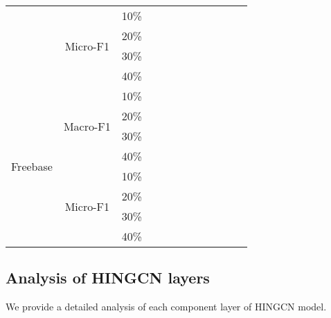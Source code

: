 \begin{table*}[!htbp]
\begin{tabular}{|c|c|c||c|c|c|c|c||c|c|c|c|}
                          & \multirow{4}{*}{Micro-F1} & 10\%     &          &              &     &     &     &        &        &        &        \\
                          &                           & 20\%     &          &              &     &     &     &        &        &        &        \\
                          &                           & 30\%     &          &              &     &     &     &        &        &        &        \\
                          &                           & 40\%     &          &              &     &     &     &        &        &        &        \\ \hline
\multirow{8}{*}{Freebase} & \multirow{4}{*}{Macro-F1} & 10\%     &          &              &     &     &     &        &        &        &        \\
                          &                           & 20\%     &          &              &     &     &     &        &        &        &        \\
                          &                           & 30\%     &          &              &     &     &     &        &        &        &        \\
                          &                           & 40\%     &          &              &     &     &     &        &        &        &        \\ \cline{2-12} 
                          & \multirow{4}{*}{Micro-F1} & 10\%     &          &              &     &     &     &        &        &        &        \\
                          &                           & 20\%     &          &              &     &     &     &        &        &        &        \\
                          &                           & 30\%     &          &              &     &     &     &        &        &        &        \\
                          &                           & 40\%     &          &              &     &     &     &        &        &        &        \\ \hline
\end{tabular}
\end{table*}

\subsection{Analysis of HINGCN layers}
We provide a detailed analysis of each component layer of HINGCN model.

